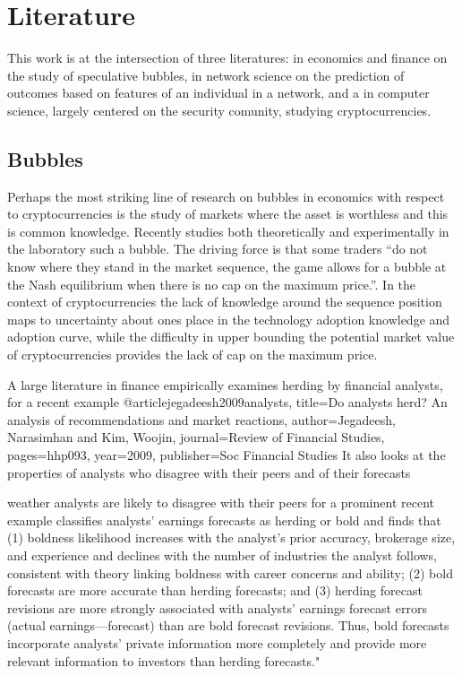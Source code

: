\section{Literature}

This work is at the intersection of three literatures: in economics and finance on the study of speculative bubbles, in network science on the prediction of outcomes based on features of an individual in a network, and a in computer science, largely centered on the security comunity, studying cryptocurrencies.


\subsection{Bubbles}

Perhaps the most striking line of research on bubbles in economics with respect to cryptocurrencies is the study of markets where the asset is worthless and this is common knowledge. 
Recently \cite{moinas2013bubble} studies both theoretically and experimentally in the laboratory such a bubble. 
The driving force is that some traders ``do not know where they stand in the market sequence, the game allows for
a bubble at the Nash equilibrium when there is no cap on the maximum price.''.
In the context of cryptocurrencies the lack of knowledge around the sequence position maps to uncertainty about ones place in the technology adoption knowledge and adoption curve, while the difficulty in upper bounding the potential market value of cryptocurrencies provides the lack of cap on the maximum price. 


A large literature in finance empirically examines herding by financial analysts, for a recent example
@article{jegadeesh2009analysts,
  title={Do analysts herd? An analysis of recommendations and market reactions},
  author={Jegadeesh, Narasimhan and Kim, Woojin},
  journal={Review of Financial Studies},
  pages={hhp093},
  year={2009},
  publisher={Soc Financial Studies}
}
It also looks at the properties of analysts who disagree with their peers and of their forecasts

 \cite{clement2005financial} 
weather analysts are likely to disagree with their peers for a prominent recent example classifies analysts' earnings forecasts as herding or bold and finds that (1) boldness likelihood increases with the analyst's prior accuracy, brokerage size, and experience and declines with the number of industries the analyst follows, consistent with theory linking boldness with career concerns and ability; (2) bold forecasts are more accurate than herding forecasts; and (3) herding forecast revisions are more strongly associated with analysts' earnings forecast errors (actual earnings—forecast) than are bold forecast revisions. Thus, bold forecasts incorporate analysts' private information more completely and provide more relevant information to investors than herding forecasts."

